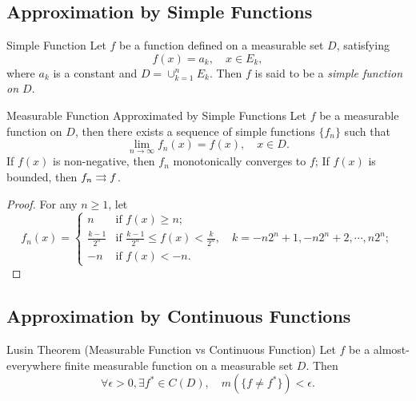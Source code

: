 \subsection{Approximation by Simple Functions}

\begin{definition}{Simple Function}{}
  Let $f$ be a function defined on a measurable set $D$, satisfying
  \begin{equation}
    f(x) = a_k, \quad x \in E_k,
  \end{equation}
  where $a_k$ is a constant and $D = \cup _{k = 1}^n E_k$.
  Then $f$ is said to be a \emph{simple function on $D$}.
\end{definition}

\begin{theorem}{Measurable Function Approximated by Simple Functions}{}
  Let $f$ be a measurable function on $D$,
  then there exists a sequence of simple functions $\{f_n\}$ such that
  \begin{equation}
    \lim \limits _{n \rightarrow \infty} f_n(x) = f(x), \quad x \in D.
  \end{equation}
  If $f(x)$ is non-negative, then $f_n$ monotonically converges to $f$;
  If $f(x)$ is bounded, then $f_n \rightrightarrows f$.
\end{theorem}

\begin{proof}
  For any $n \geq 1$, let
  \begin{equation}
    f_n(x) =
    \begin{cases}
      n & \text{if } f(x) \geq n;\\
      \frac{k-1}{2^n} & \text{if } \frac{k-1}{2^n} \leq f(x) < \frac{k}{2^n},
                        \quad k=-n2^n+1,-n2^n+2,\cdots,n2^n;\\
      -n & \text{if } f(x) < -n.
    \end{cases}
  \end{equation}
\end{proof}

\subsection{Approximation by Continuous Functions}

\begin{theorem}{Lusin Theorem (Measurable Function vs Continuous Function)}{}
  Let $f$ be a almost-everywhere finite measurable function on a measurable set
  $D$.
  Then
  \begin{equation}
    \forall \epsilon > 0, \exists f^{\ast} \in C(D), \quad
    m(\{f \neq f^{\ast}\}) < \epsilon.
  \end{equation}
\end{theorem}

